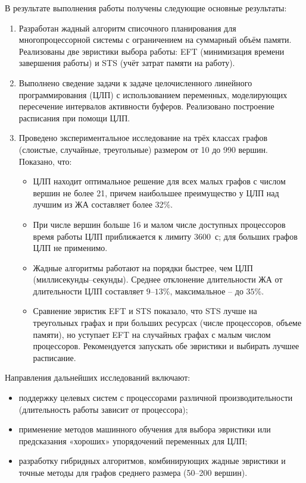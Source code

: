\label{sec:7_zakluch} 

\singlespace

В результате выполнения работы получены следующие основные результаты:
\begin{enumerate}
	\item Разработан жадный алгоритм списочного планирования для многопроцессорной системы с ограничением на суммарный объём памяти. Реализованы две эвристики выбора работы: EFT (минимизация времени завершения работы) и STS (учёт затрат памяти на работу).
	\item Выполнено сведение задачи к задаче целочисленного линейного программирования (ЦЛП) с использованием переменных, моделирующих пересечение интервалов активности буферов. Реализовано построение расписания при помощи ЦЛП.
	\item Проведено экспериментальное исследование на трёх классах графов (слоистые, случайные, треугольные) размером от 10 до 990 вершин. Показано, что:
	\begin{itemize}
		\item ЦЛП находит оптимальное решение для всех малых графов с числом вершин не более 21, причем наибольшее преимущество у ЦЛП над лучшим из ЖА составляет более 32\%.
		\item При числе вершин больше 16 и малом числе доступных процессоров время работы ЦЛП приближается к лимиту 3600~с; для больших графов ЦЛП не применимо.
		\item Жадные алгоритмы работают на порядки быстрее, чем ЦЛП (миллисекунды–секунды). Среднее отклонение длительности ЖА от длительности ЦЛП составляет $9$–$13\%$, максимальное – до $35\%$.
		\item Сравнение эвристик EFT и STS показало, что STS лучше на треугольных графах и при больших ресурсах (числе процессоров, объеме памяти), но уступает EFT на случайных графах с малым числом процессоров. Рекомендуется запускать обе эвристики и выбирать лучшее расписание.
	\end{itemize}
\end{enumerate}

Направления дальнейших исследований включают:
\begin{itemize}
	\item поддержку целевых систем с процессорами различной производительности (длительность работы зависит от процессора);
	\item применение методов машинного обучения для выбора эвристики или предсказания «хороших» упорядочений переменных для ЦЛП;
	\item разработку гибридных алгоритмов, комбинирующих жадные эвристики и точные методы для графов среднего размера (50–200 вершин).
\end{itemize}
